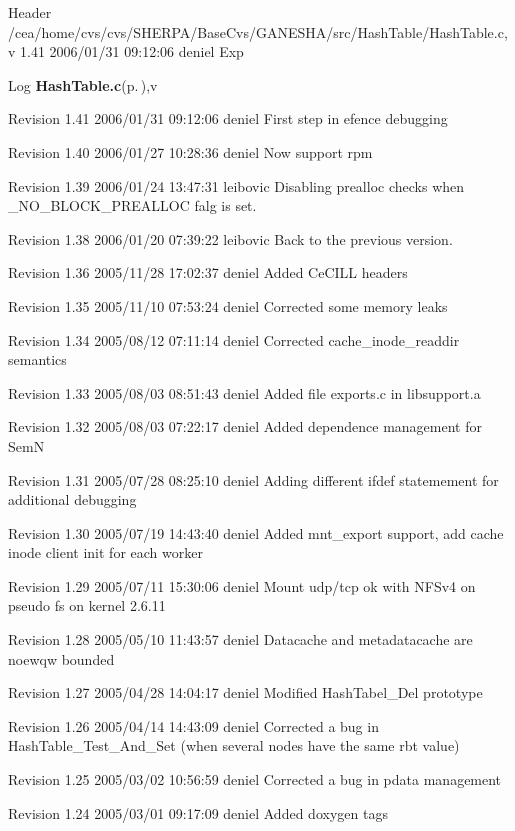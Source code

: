 \begin{Desc}
\item[Header]/cea/home/cvs/cvs/SHERPA/Base\-Cvs/GANESHA/src/Hash\-Table/Hash\-Table.c,v 1.41 2006/01/31 09:12:06 deniel Exp \end{Desc}


\begin{Desc}
\item[Log]{\bf Hash\-Table.c}{\rm (p.\,\pageref{HashTable_8c})},v \end{Desc}
Revision 1.41 2006/01/31 09:12:06 deniel First step in efence debugging

Revision 1.40 2006/01/27 10:28:36 deniel Now support rpm

Revision 1.39 2006/01/24 13:47:31 leibovic Disabling prealloc checks when \_\-NO\_\-BLOCK\_\-PREALLOC falg is set.

Revision 1.38 2006/01/20 07:39:22 leibovic Back to the previous version.

Revision 1.36 2005/11/28 17:02:37 deniel Added Ce\-CILL headers

Revision 1.35 2005/11/10 07:53:24 deniel Corrected some memory leaks

Revision 1.34 2005/08/12 07:11:14 deniel Corrected cache\_\-inode\_\-readdir semantics

Revision 1.33 2005/08/03 08:51:43 deniel Added file exports.c in libsupport.a

Revision 1.32 2005/08/03 07:22:17 deniel Added dependence management for Sem\-N

Revision 1.31 2005/07/28 08:25:10 deniel Adding different ifdef statemement for additional debugging

Revision 1.30 2005/07/19 14:43:40 deniel Added mnt\_\-export support, add cache inode client init for each worker

Revision 1.29 2005/07/11 15:30:06 deniel Mount udp/tcp ok with NFSv4 on pseudo fs on kernel 2.6.11

Revision 1.28 2005/05/10 11:43:57 deniel Datacache and metadatacache are noewqw bounded

Revision 1.27 2005/04/28 14:04:17 deniel Modified Hash\-Tabel\_\-Del prototype

Revision 1.26 2005/04/14 14:43:09 deniel Corrected a bug in Hash\-Table\_\-Test\_\-And\_\-Set (when several nodes have the same rbt value)

Revision 1.25 2005/03/02 10:56:59 deniel Corrected a bug in pdata management

Revision 1.24 2005/03/01 09:17:09 deniel Added doxygen tags

